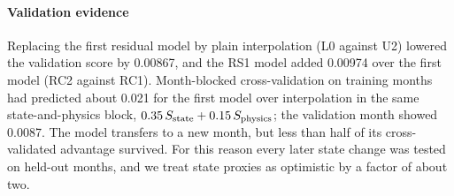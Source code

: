 \paragraph{Validation evidence} Replacing the first residual model by plain interpolation (L0 against U2) lowered
the validation score by 0.00867, and the RS1 model added 0.00974 over the first model (RC2 against RC1).
Month-blocked cross-validation on training months had predicted about 0.021 for the first model over interpolation in
the same state-and-physics block, $0.35\,S_{\mathrm{state}}+0.15\,S_{\mathrm{physics}}$; the validation month showed 0.0087. The model
transfers to a new month, but less than half of its cross-validated advantage survived. For this reason every later
state change was tested on held-out months, and we treat state proxies as optimistic by a factor of about two.
